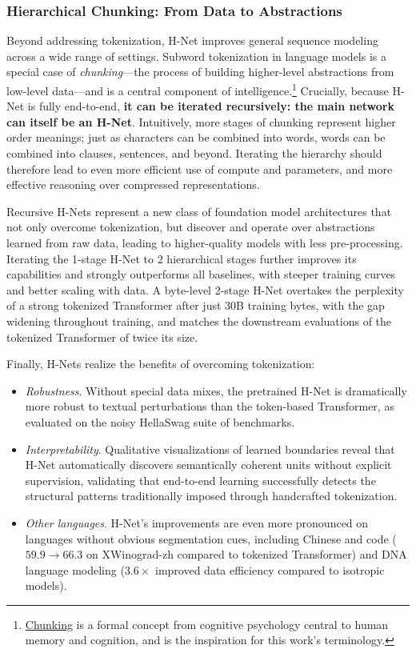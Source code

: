 \documentclass{article}
\theoremstyle{plain}
\theoremstyle{remark}
\begin{document}
\vspace*{1em}

\subsubsection*{Hierarchical Chunking: From Data to Abstractions}

Beyond addressing tokenization, H-Net improves general sequence modeling across a wide range of settings.
Subword tokenization in language models is a special case of \emph{chunking}---the process of building higher-level abstractions from low-level data---and is a central component of intelligence.\footnote{\href{https://en.wikipedia.org/wiki/Chunking_(psychology)}{Chunking} is a formal concept from cognitive psychology central to human memory and cognition, and is the inspiration for this work's terminology.}
Crucially, because H-Net is fully end-to-end, \textbf{it can be iterated recursively: the main network can itself be an H-Net}.
Intuitively, more stages of chunking represent higher order meanings; just as characters can be combined into words, words can be combined into clauses, sentences, and beyond.
Iterating the hierarchy should therefore lead to even more efficient use of compute and parameters, and more effective reasoning over compressed representations.

Recursive H-Nets represent a new class of foundation model architectures that not only overcome tokenization, but discover and operate over abstractions learned from raw data, leading to higher-quality models with less pre-processing.
Iterating the 1-stage H-Net to 2 hierarchical stages further improves its capabilities and strongly outperforms all baselines, with steeper training curves and better scaling with data.
A byte-level 2-stage H-Net overtakes the perplexity of a strong tokenized Transformer after just 30B training bytes, with the gap widening throughout training, and matches the downstream evaluations of the tokenized Transformer of twice its size.

Finally, H-Nets realize the benefits of overcoming tokenization:
\begin{itemize}
    \item \textit{Robustness}.
    Without special data mixes, the pretrained H-Net is dramatically more robust to textual perturbations than the token-based Transformer, as evaluated on the noisy HellaSwag suite of benchmarks.
    \item \textit{Interpretability}.
    Qualitative visualizations of learned boundaries reveal that H-Net automatically discovers semantically coherent units without explicit supervision, validating that end-to-end learning successfully detects the structural patterns traditionally imposed through handcrafted tokenization.
    \item \textit{Other languages}.
    H-Net's improvements are even more pronounced on languages without obvious segmentation cues, including Chinese and code ($59.9 \to 66.3$ on XWinograd-zh compared to tokenized Transformer) and DNA language modeling ($3.6\times$ improved data efficiency compared to isotropic models).
\end{itemize}
\end{document}
